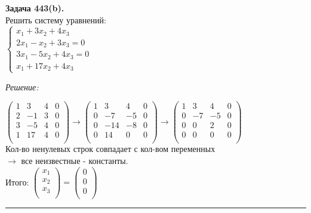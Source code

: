 \documentclass[a4paper, 12pt]{article}
\newenvironment{problem}[2][Задача]
{ \begin{mdframed}[backgroundcolor=gray!10] \textbf{#1 #2.} \\}
{  \end{mdframed}}
\newenvironment{solution}
{\textit{Решение: }}
{\noindent\rule{7in}{1.5pt}}
\begin{document}
\begin{problem}{443(b)}
  Решить систему уравнений:\\
  $\left\{\begin{array}{l}
      x_1+3x_2+4x_3\\
      2x_1-x_2+3x_3=0\\
      3x_1-5x_2+4x_3=0\\
      x_1+17x_2+4x_3
  \end{array}\right.$


\end{problem}
\begin{solution}

  $
  \left(
    \begin{array}{rrrrrrrr}
      1 &  3 & 4 & 0 \\
      2 & -1 & 3 & 0 \\
      3 & -5 & 4 & 0 \\
      1 & 17 & 4 & 0 \\
    \end{array}
  \right)
  \rightarrow
  \left(
    \begin{array}{rrrrrrrr}
      1 &   3 &  4 & 0 \\
      0 &  -7 & -5 & 0 \\
      0 & -14 & -8 & 0 \\
      0 &  14 &  0 & 0 \\
    \end{array}
  \right)
  \rightarrow
  \left(
    \begin{array}{rrrrrrrr}
      1 &  3 &  4 & 0 \\
      0 & -7 & -5 & 0 \\
      0 &  0 &  2 & 0 \\
      0 &  0 &  0 & 0 \\
    \end{array}
  \right)
  $ \\
Кол-во ненулевых строк совпадает с кол-вом переменных \\ $\rightarrow$ все неизвестные - константы. \\
Итого:
$
\left(
  \begin{array}{r}
    x_1 \\
    x_2 \\
    x_3 \\
  \end{array}
\right)
=
\left(
  \begin{array}{r}
    0 \\
    0 \\
    0 \\
  \end{array}
\right)
$

\end{solution}
\end{document}
